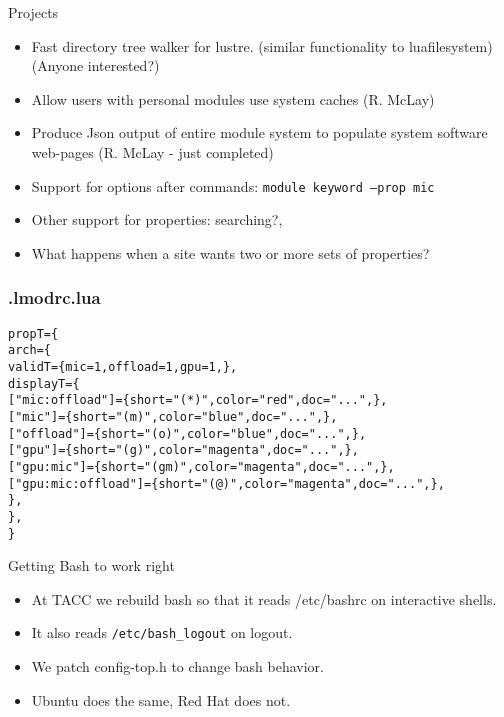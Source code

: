 \documentclass{beamer}
\begin{document}
\begin{frame}{Projects}
  \begin{itemize}
    \item Fast directory tree walker for lustre. (similar
      functionality to luafilesystem) (Anyone interested?)
    \item Allow users with personal modules use system caches (R. McLay)
    \item Produce Json output of entire module system to populate
      system software web-pages (R. McLay - just completed)
    \item Support for options after commands:  \texttt{module keyword --prop mic}
    \item Other support for properties: searching?,
    \item What happens when a site wants two or more sets of properties?
  \end{itemize}
\end{frame}







\begin{frame}[fragile]
    \frametitle{.lmodrc.lua}
  {\tiny
    \begin{alltt}
propT = \{
   arch = \{
      validT = \{ mic = 1, offload = 1, gpu = 1, \},
      displayT = \{
         ["mic:offload"]     = \{ short = "(*)",  color = "red",     doc = "...",\},
         ["mic"]             = \{ short = "(m)",  color = "blue",    doc = "...",\},
         ["offload"]         = \{ short = "(o)",  color = "blue",    doc = "...",\},
         ["gpu"]             = \{ short = "(g)",  color = "magenta", doc = "...",\},
         ["gpu:mic"]         = \{ short = "(gm)", color = "magenta", doc = "...",\},
         ["gpu:mic:offload"] = \{ short = "(@)",  color = "magenta", doc = "...",\},
      \},
   \},
\}

    \end{alltt}
}
\end{frame}

\begin{frame}{Getting Bash to work right}
  \begin{itemize}
    \item At TACC we rebuild bash so that it reads /etc/bashrc on
      interactive shells.
    \item It also reads \texttt{/etc/bash\_logout} on logout.
    \item We patch config-top.h to change bash behavior.
    \item Ubuntu does the same, Red Hat does not.
  \end{itemize}
\end{frame}
\end{document}
